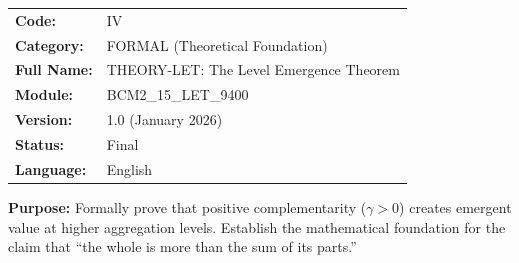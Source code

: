 %
%


\begin{tcolorbox}[colback=gray!5!white, colframe=gray!75!black,
    title=Appendix Header: IV THEORY-LET]

\begin{tabular}{@{}ll@{}}
\textbf{Code:} & IV \\
\textbf{Category:} & FORMAL (Theoretical Foundation) \\
\textbf{Full Name:} & THEORY-LET: The Level Emergence Theorem \\
\textbf{Module:} & BCM2\_15\_LET\_9400 \\
\textbf{Version:} & 1.0 (January 2026) \\
\textbf{Status:} & Final \\
\textbf{Language:} & English \\
\end{tabular}

\vspace{0.5em}
\textbf{Purpose:} Formally prove that positive complementarity ($\gamma > 0$)
creates emergent value at higher aggregation levels. Establish the mathematical
foundation for the claim that ``the whole is more than the sum of its parts.''

\end{tcolorbox}


